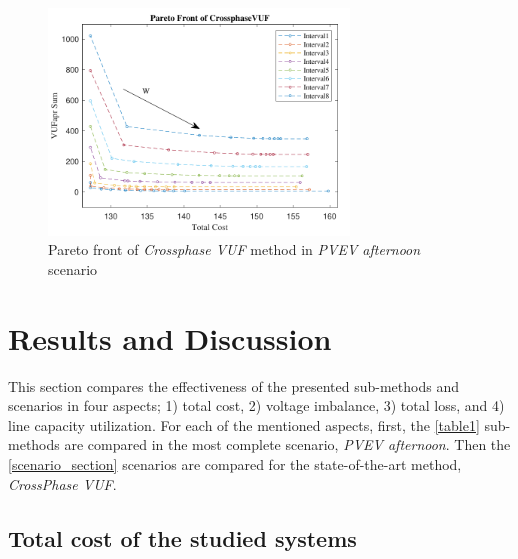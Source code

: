 \documentclass[journal]{IEEEtran}
\begin{document}
\begin{figure}
\centering
\includegraphics[width=8cm]{pdf/Final.pdf}
\vspace*{-0.3cm}
\caption{Pareto front of \textit{Crossphase VUF} method in \textit{PVEV afternoon} scenario}
\label{prt}
\end{figure}


\section {Results and Discussion}

This section compares the effectiveness of the presented sub-methods and scenarios in four aspects; 1) total cost, 2) voltage imbalance, 3)  total loss, and 4) line capacity utilization. For each of the mentioned aspects, first, the \ref{table1} sub-methods are compared in the most complete scenario, \textit{PVEV afternoon}. Then the \ref{scenario_section} scenarios are compared for the state-of-the-art method, \textit{CrossPhase VUF}.





\subsection{Total cost of the studied systems}
\end{document}
